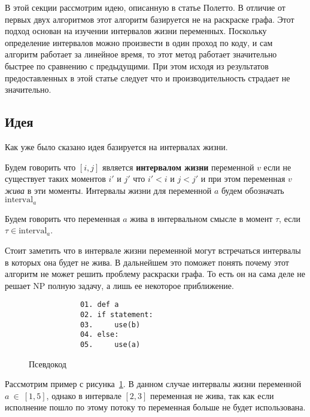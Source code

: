 В этой секции рассмотрим идею, описанную в статье Полетто. В отличие от первых двух алгоритмов
этот алгоритм базируется не на раскраске графа. Этот подход основан на изучении интервалов жизни
переменных. Поскольку определение интервалов можно произвести в один проход по коду, и сам алгоритм
работает за линейное время, то этот метод работает значительно быстрее по сравнению с предыдущими.
При этом исходя из результатов предоставленных в этой статье следует что и производительность
страдает не значительно.

\subsection{Идея}

Как уже было сказано идея базируется на интервалах жизни.

\begin{definition}
    Будем говорить что $[i, j]$ является \textbf{интервалом жизни} переменной $v$ если не существует таких
    моментов $i'$ и $j'$ что $i' < i$ и $j < j'$ и при этом переменная $v$ \textit{жива} в эти моменты.
    Интервалы жизни для переменной $a$ будем обозначать $\text{interval}_a$
\end{definition}

\begin{definition}
    Будем говорить что переменная $a$ жива в интервальном смысле в момент $\tau$, если $\tau \in \text{interval}_a$. 
\end{definition}

Стоит заметить что в интервале жизни переменной могут встречаться интервалы в которых она будет
не жива. В дальнейшем это поможет понять почему этот алгоритм не может решить проблему раскраски графа. То
есть он на сама деле не решает NP полную задачу, а лишь ее некоторое приближение.

\begin{example}
    \begin{figure}
        \centering
        \lstset{basicstyle=\ttfamily\small, frame=single}
        \begin{lstlisting}
            01. def a
            02. if statement:
            03.     use(b)
            04. else:
            05.     use(a)
        \end{lstlisting}
        \caption{Псевдокод}
        \label{fig:example_live_intervals}
    \end{figure}

    Рассмотрим пример с рисунка~\ref{fig:example_live_intervals}. В данном случае интервалы жизни переменной
    $a~\in~[1,5]$, однако в интервале $[2,3]$ переменная не жива, так как если исполнение пошло по этому потоку
    то переменная больше не будет использована.
    
\end{example}

